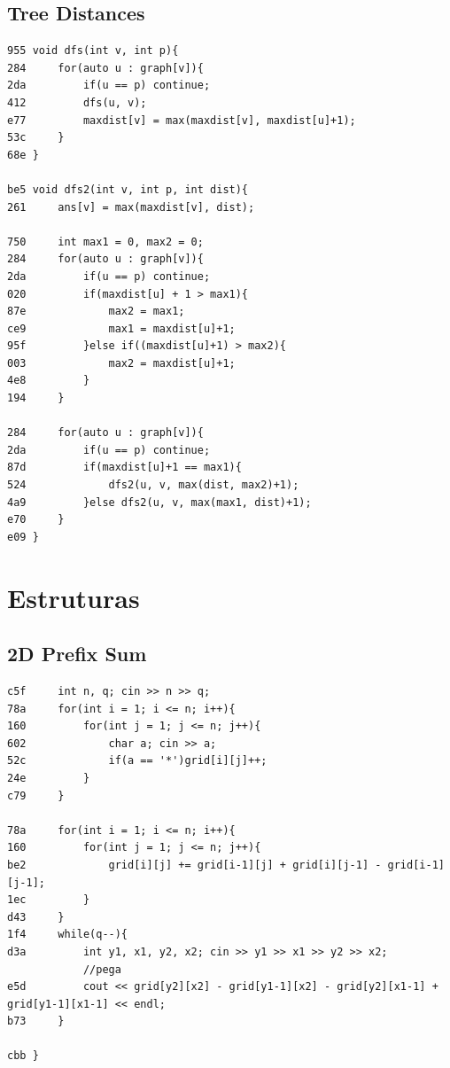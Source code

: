 \documentclass[11pt, a4paper, twoside]{article}
\begin{document}
\subsection{Tree Distances}
\begin{lstlisting}
955 void dfs(int v, int p){
284     for(auto u : graph[v]){
2da         if(u == p) continue;
412         dfs(u, v);
e77         maxdist[v] = max(maxdist[v], maxdist[u]+1);
53c     }
68e }
 
be5 void dfs2(int v, int p, int dist){
261     ans[v] = max(maxdist[v], dist);
     
750     int max1 = 0, max2 = 0;
284     for(auto u : graph[v]){
2da         if(u == p) continue;
020         if(maxdist[u] + 1 > max1){
87e             max2 = max1;
ce9             max1 = maxdist[u]+1;
95f         }else if((maxdist[u]+1) > max2){
003             max2 = maxdist[u]+1;
4e8         }
194     }
     
284     for(auto u : graph[v]){
2da         if(u == p) continue;
87d         if(maxdist[u]+1 == max1){
524             dfs2(u, v, max(dist, max2)+1);
4a9         }else dfs2(u, v, max(max1, dist)+1);
e70     }
e09 }
\end{lstlisting}



%
%

\section{Estruturas}

\subsection{2D Prefix Sum}
\begin{lstlisting}
c5f     int n, q; cin >> n >> q;
78a     for(int i = 1; i <= n; i++){
160         for(int j = 1; j <= n; j++){
602             char a; cin >> a;
52c             if(a == '*')grid[i][j]++;
24e         }
c79     }
 
78a     for(int i = 1; i <= n; i++){
160         for(int j = 1; j <= n; j++){
be2             grid[i][j] += grid[i-1][j] + grid[i][j-1] - grid[i-1][j-1];
1ec         }
d43     }
1f4     while(q--){
d3a         int y1, x1, y2, x2; cin >> y1 >> x1 >> y2 >> x2;
            //pega 
e5d         cout << grid[y2][x2] - grid[y1-1][x2] - grid[y2][x1-1] + grid[y1-1][x1-1] << endl;
b73     }

cbb }
\end{lstlisting}
\end{document}
